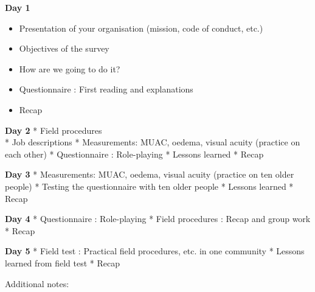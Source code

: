 \documentclass[12pt,a4paper]{book}
\providecommand{\tightlist}{%
  \setlength{\itemsep}{0pt}\setlength{\parskip}{0pt}}
\theoremstyle{definition}
\theoremstyle{definition}
\theoremstyle{definition}
\theoremstyle{remark}
\begin{document}
\textbf{Day 1}

\begin{itemize}
\tightlist
\item
  Presentation of your organisation (mission, code of conduct, etc.)
\item
  Objectives of the survey\\
\item
  How are we going to do it?\\
\item
  Questionnaire : First reading and explanations
\item
  Recap
\end{itemize}

\textbf{Day 2} * Field procedures\\
* Job descriptions * Measurements: MUAC, oedema, visual acuity (practice
on each other) * Questionnaire : Role-playing * Lessons learned * Recap

\textbf{Day 3} * Measurements: MUAC, oedema, visual acuity (practice on
ten older people) * Testing the questionnaire with ten older people *
Lessons learned * Recap

\textbf{Day 4} * Questionnaire : Role-playing * Field procedures : Recap
and group work * Recap

\textbf{Day 5} * Field test : Practical field procedures, etc. in one
community * Lessons learned from field test * Recap

Additional notes:
\end{document}
